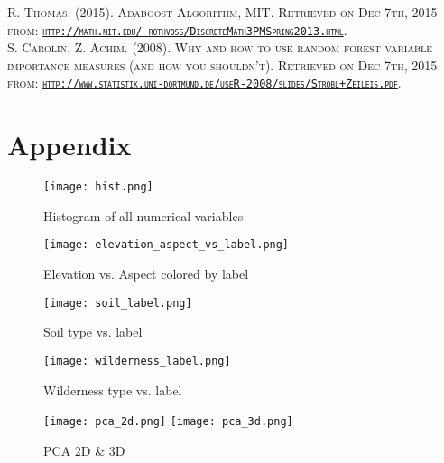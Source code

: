 \documentclass[11pt]{article}
\begin{document}
\begin{thebibliography}{99\kern\bibindent}
\textsc{R. Thomas. (2015). Adaboost Algorithm, MIT. Retrieved on Dec 7th, 2015 from: \href{http://math.mit.edu/~rothvoss/DiscreteMath3PMSpring2013.html}{\texttt{http://math.mit.edu/~rothvoss/DiscreteMath3PMSpring2013.html}}.}\\
[0.2cm]

\textsc{S. Carolin, Z. Achim. (2008). Why and how to use random forest variable importance measures (and how you shouldn't). Retrieved on Dec 7th, 2015 from: \href{http://www.statistik.uni-dortmund.de/useR-2008/slides/Strobl+Zeileis.pdf}{\texttt{http://www.statistik.uni-dortmund.de/useR-2008/slides/Strobl+Zeileis.pdf}}. }\\
[0.2cm]

\end{thebibliography}


\section{Appendix}

\begin{figure}[h]
\label{eda1}
\begin{center}
\texttt{[image: hist.png]}
\end{center}
\caption{Histogram of all numerical variables}
\end{figure}

\begin{figure}[h] 
\label{eda2}
\begin{center}
\texttt{[image: elevation\_aspect\_vs\_label.png]}
\end{center}
\caption{Elevation vs. Aspect colored by label}
\end{figure}

\begin{figure}[h]
\label{eda3}
\begin{center}
\texttt{[image: soil\_label.png]}
\end{center}
\caption{Soil type vs. label}
\end{figure}

\begin{figure}[h]
\label{eda4}
\begin{center}
\texttt{[image: wilderness\_label.png]}
\end{center}
\caption{Wilderness type vs. label}
\end{figure}

\begin{figure}[h]
\label{pca}
\begin{center}
\texttt{[image: pca\_2d.png]}
\texttt{[image: pca\_3d.png]}
\end{center}
\caption{PCA 2D $\&$ 3D}
\end{figure}
\end{document}
